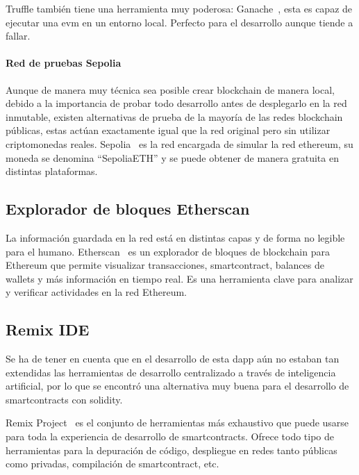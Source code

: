Truffle también tiene una herramienta muy poderosa: Ganache~\cite{[19]}, 
esta es capaz de ejecutar  una \gls{evm} en un entorno local. 
Perfecto para el desarrollo aunque tiende a fallar.

\paragraph{Red de pruebas Sepolia}

Aunque de manera muy técnica sea posible crear \gls{blockchain} de manera local,
debido a la importancia de probar todo desarrollo antes de desplegarlo en la red 
inmutable, existen alternativas de prueba de la mayoría de las redes \gls{blockchain} 
públicas, estas actúan exactamente igual que la red original pero sin utilizar \glspl{criptomoneda} reales.
Sepolia~\cite{[21]} es la red encargada de simular la red \gls{ethereum}, su moneda
se denomina \enquote{SepoliaETH} y se puede obtener de manera gratuita en distintas
plataformas.

\subsection{Explorador de bloques Etherscan}

La información guardada en la red está en distintas capas y de forma no legible
para el humano. Etherscan~\cite{[20]} es un explorador de bloques de 
\gls{blockchain} para Ethereum que permite visualizar transacciones, 
\gls{smartcontract}, 
balances de \glspl{wallet} y más información en tiempo real. 
Es una herramienta clave para analizar y verificar 
actividades en la red Ethereum.

\subsection{Remix IDE}

Se ha de tener en cuenta que en el desarrollo de esta \gls{dapp} aún no estaban 
tan extendidas las herramientas de desarrollo centralizado a través de inteligencia
artificial, por lo que se encontró una alternativa muy buena para el desarrollo
de \glspl{smartcontract} con \gls{solidity}.

Remix Project~\cite{[16]} es el conjunto de herramientas más exhaustivo que
puede usarse para toda la experiencia de desarrollo de  \glspl{smartcontract}.
Ofrece todo tipo de herramientas para la depuración de código, despliegue en redes 
tanto públicas como privadas, compilación de \gls{smartcontract}, etc.

